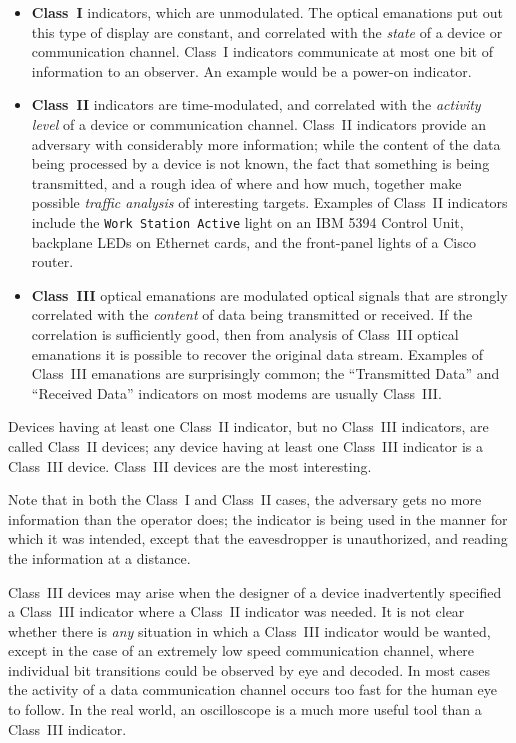 \documentclass{acmtrans2e}
\begin{document}
\begin{itemize}

\item{\bf Class~I} indicators, which are unmodulated.  The
optical emanations put out this type of display are constant, and
correlated with the {\it state} of a device
or communication channel.  Class~I indicators communicate at most one bit 
of information to an observer.  An example would be a power-on indicator.

\item {\bf Class~II} indicators are time-modulated, and correlated with
the {\it activity level} of a device or communication 
channel.  Class~II indicators provide an adversary with considerably 
more information; while the content of the data being processed by a 
device is not known, the fact that something is being transmitted, and a 
rough idea of where and how much, together make possible
{\it traffic analysis} of interesting targets.  Examples of Class~II
indicators 
include the {\tt Work Station Active} light on an IBM 5394 Control Unit, 
backplane LEDs on Ethernet cards, and the front-panel lights of a Cisco
router.

\item {\bf Class~III} optical emanations are modulated optical
signals that are strongly 
correlated with the {\it content} of data being transmitted or received.  
If the correlation is sufficiently good, then from analysis of Class~III 
optical emanations it is possible to recover the original data stream. 
Examples of Class~III emanations are surprisingly common; the 
``Transmitted Data'' and ``Received Data'' indicators on most modems
are usually Class~III.

\end{itemize}

Devices having at least one Class~II 
indicator, but no Class~III indicators, are called Class~II devices; 
any device having at least one Class~III indicator is a Class~III 
device.  Class~III devices are the most interesting.

Note that in both the Class~I and Class~II cases, the adversary gets no more 
information than the operator does; the indicator is being used in the 
manner for which it was intended, except that the eavesdropper is 
unauthorized, and reading the information at a distance.

Class~III devices may arise when the designer of a device inadvertently 
specified a Class~III indicator where a Class~II indicator was needed.
It is not clear whether 
there is {\it any} situation in which a Class~III indicator would be 
wanted, except in the case of an extremely low speed communication 
channel, where individual bit transitions could be observed by eye and 
decoded.  In most cases the activity of a data communication channel 
occurs too fast for the human eye to follow.  In the real world, an 
oscilloscope is a much more useful tool than a Class~III indicator.
\end{document}

